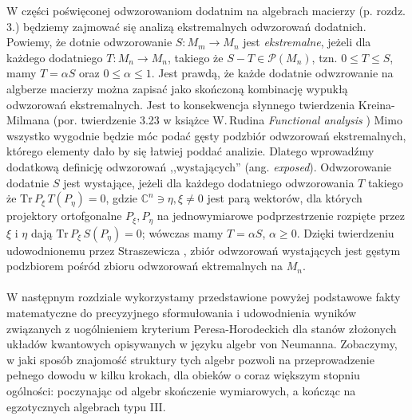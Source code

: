 W części poświęconej odwzorowaniom dodatnim na algebrach macierzy (p. rozdz. 3.)
będziemy zajmować się analizą ekstremalnych odwzorowań dodatnich.
Powiemy, że dotnie odwzorowanie $S: M_{m} \rightarrow M_{n}$ jest \emph{ekstremalne},
jeżeli dla każdego dodatniego $T: M_{n} \rightarrow M_{n}$, takiego że
$S - T \in \mathcal{P}(M_{n})$,
tzn. $0 \leq T \leq S$,
mamy $T = \alpha S$ oraz $0 \leq \alpha \leq 1$.
Jest prawdą, że każde dodatnie odwzrowanie na algberze macierzy można zapisać
jako skończoną kombinację wypukłą odwzorowań ekstremalnych.
Jest to konsekwencja słynnego twierdzenia Kreina-Milmana
(por. twierdzenie 3.23 w książce W.\,Rudina \emph{Functional analysis}
\cite{Rudin1991})
Mimo wszystko wygodnie będzie móc podać gęsty podzbiór odwzorowań ekstremalnych,
którego elementy dało by się łatwiej poddać analizie.
Dlatego wprowadźmy dodatkową definicję odwzorowań ,,wystających''
(ang. \emph{exposed}).
Odwzorowanie dodatnie $S$ jest wystające, jeżeli dla każdego dodatniego odwzorowania
$T$ takiego że
$\text{Tr}\, P_{\xi} \, T(P_{\eta}) = 0$,
gdzie
$\mathbb{C}^{n} \ni \eta, \xi \neq 0$ jest parą wektorów,
dla których projektory ortofgonalne $P_{\xi}, P_{\eta}$ na jednowymiarowe
podprzestrzenie rozpięte przez $\xi$ i $\eta$ dają
$\text{Tr}\, P_{\xi} \, S(P_{\eta}) = 0$;
wówczas mamy $T = \alpha S$, $\alpha \geq 0$.
Dzięki twierdzeniu udowodnionemu przez Straszewicza \cite{straszewicz1935exponierte},
zbiór odwzorowań wystających jest gęstym podzbiorem pośród zbioru odwzorowań
ektremalnych na $M_{n}$.

\paragraph{}
W następnym rozdziale wykorzystamy przedstawione powyżej podstawowe fakty
matematyczne do precyzyjnego sformułowania i udowodnienia wyników związanych
z uogólnieniem kryterium Peresa-Horodeckich dla stanów złożonych układów
kwantowych opisywanych w języku algebr von Neumanna.
Zobaczymy,
w jaki sposób znajomość struktury tych algebr pozwoli na przeprowadzenie
pełnego dowodu w kilku krokach, dla obieków o coraz większym stopniu ogólności:
poczynając od algebr skończenie wymiarowych,
a kończąc na egzotycznych algebrach typu III.
